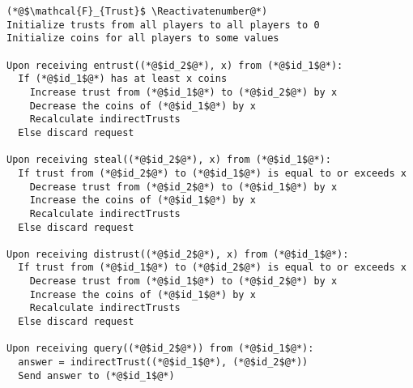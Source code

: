 \Suppressnumber
\begin{lstlisting}[label=trustfunc, style=numbers]
(*@$\mathcal{F}_{Trust}$ \Reactivatenumber@*)
Initialize trusts from all players to all players to 0
Initialize coins for all players to some values

Upon receiving entrust((*@$id_2$@*), x) from (*@$id_1$@*):
  If (*@$id_1$@*) has at least x coins
    Increase trust from (*@$id_1$@*) to (*@$id_2$@*) by x
    Decrease the coins of (*@$id_1$@*) by x
    Recalculate indirectTrusts
  Else discard request

Upon receiving steal((*@$id_2$@*), x) from (*@$id_1$@*):
  If trust from (*@$id_2$@*) to (*@$id_1$@*) is equal to or exceeds x
    Decrease trust from (*@$id_2$@*) to (*@$id_1$@*) by x
    Increase the coins of (*@$id_1$@*) by x
    Recalculate indirectTrusts
  Else discard request

Upon receiving distrust((*@$id_2$@*), x) from (*@$id_1$@*):
  If trust from (*@$id_1$@*) to (*@$id_2$@*) is equal to or exceeds x
    Decrease trust from (*@$id_1$@*) to (*@$id_2$@*) by x
    Increase the coins of (*@$id_1$@*) by x
    Recalculate indirectTrusts
  Else discard request

Upon receiving query((*@$id_2$@*)) from (*@$id_1$@*):
  answer = indirectTrust((*@$id_1$@*), (*@$id_2$@*))
  Send answer to (*@$id_1$@*)
\end{lstlisting}

